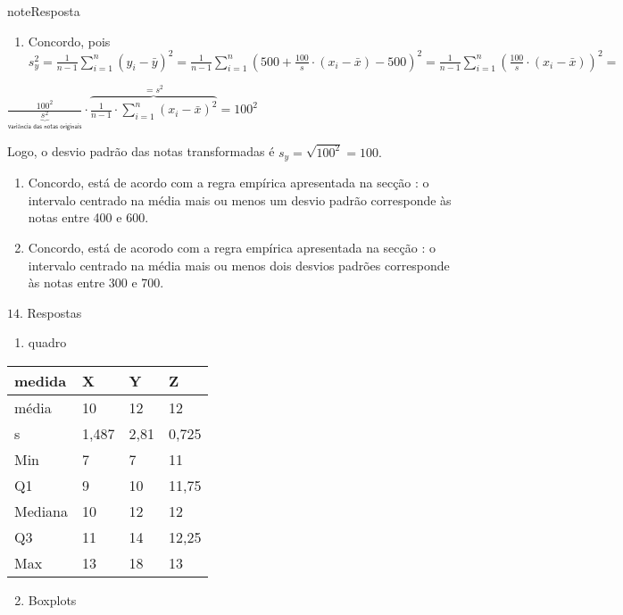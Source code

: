 \begin{sphinxadmonition}{note}{Resposta}
\begin{enumerate}
\item {} 
Concordo, pois \(s^2_y=\frac{1}{n-1}\displaystyle{\sum^n_{i=1}}(y_i-\bar{y})^2=\frac{1}{n-1}\displaystyle{\sum^n_{i=1}}(500+\frac{100}{s}\cdot (x_i-\bar{x})-500)^2=\frac{1}{n-1}\displaystyle{\sum^n_{i=1}}(\frac{100}{s}\cdot (x_i-\bar{x}))^2=\)

\end{enumerate}

\(\frac{100^2}{\underbrace{s^2}_{\textsf{variância das notas originais}}}\cdot \overbrace{\frac{1}{n-1}\cdot \displaystyle{\sum^n_{i=1}}(x_i-\bar{x})^2}^{=s^2}=100^2\)

Logo, o desvio padrão das notas transformadas é \(s_y=\sqrt{100^2}=100.\)
\begin{enumerate}
\item {} 
Concordo, está de acordo com a regra empírica apresentada na secção : o intervalo centrado na média mais ou menos um desvio padrão corresponde às notas entre 400 e 600.

\item {} 
Concordo, está de acorodo com a regra empírica apresentada na secção : o intervalo centrado na média mais ou menos dois desvios padrões corresponde às notas entre 300 e 700.

\end{enumerate}

\(14.\) Respostas
\begin{enumerate}
\item {} 
quadro

\end{enumerate}


\begin{savenotes}\sphinxattablestart
\centering
{}
\label{\detokenize{PE104-E:id15}}
\sphinxaftercaption
\begin{tabulary}{\linewidth}[t]{|T|T|T|T|}
\hline

medida
&
X
&
Y
&
Z
\\
\hline
média
&
10
&
12
&
12
\\
\hline
s
&
1,487
&
2,81
&
0,725
\\
\hline
Min
&
7
&
7
&
11
\\
\hline
Q1
&
9
&
10
&
11,75
\\
\hline
Mediana
&
10
&
12
&
12
\\
\hline
Q3
&
11
&
14
&
12,25
\\
\hline
Max
&
13
&
18
&
13
\\
\hline
\end{tabulary}
\par
\sphinxattableend\end{savenotes}
\begin{enumerate}
\setcounter{enumi}{1}
\item {} 
Boxplots


\end{enumerate}
\end{sphinxadmonition}
